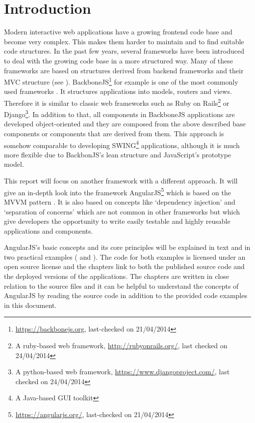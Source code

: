 \chapter{Introduction}
\label{ch:introduction}

Modern interactive web applications have a growing frontend code base and become very complex. This makes them harder to maintain and to find suitable code structures. In the past few years, several frameworks have been introduced to deal with the growing code base in a more structured way. Many of these frameworks are based on structures derived from backend frameworks and their MVC structure (see ). BackboneJS\footnote{\url{https://backbonejs.org}, last-checked on 21/04/2014} for example is one of the most commonly used frameworks \cite{sanderson2012rich}. It structures applications into models, routers and views. Therefore it is similar to classic web frameworks such as Ruby on Rails\footnote{A ruby-based web framework, \url{http://rubyonrails.org/}, last checked on 24/04/2014} or Django\footnote{A python-based web framework, \url{https://www.djangoproject.com/}, last checked on 24/04/2014}. In addition to that, all components in BackboneJS applications are developed object-oriented and they are composed from the above described base components or components that are derived from them. This approach is somehow comparable to developing SWING\footnote{A Java-based GUI toolkit} applications, although it is much more flexible due to BackbonJS's lean structure and JavaScript's prototype model.

This report will focus on another framework with a different approach. It will give an in-depth look into the framework AngularJS\footnote{\url{https://angularjs.org/}, last-checked on 21/04/2014} which is based on the MVVM pattern \cite{minar2012mvvm}. It is also based on concepts like `dependency injection' and `separation of concerns' which are not common in other frameworks but which give developers the opportunity to write easily testable and highly reusable applications and components.

AngularJS's basic concepts and its core principles will be explained in text and in two practical examples ( and ). The code for both examples is licensed under an open source license and the chapters link to both the published source code and the deployed versions of the applications. The chapters are written in close relation to the source files and it can be helpful to understand the concepts of AngularJS by reading the source code in addition to the provided code examples in this document.

